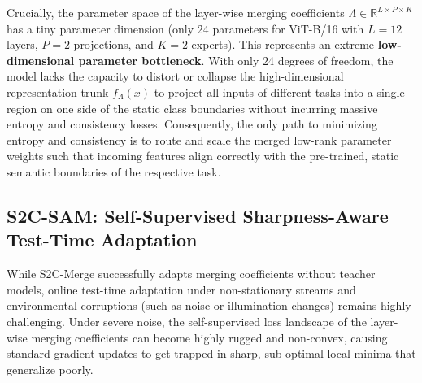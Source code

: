 \documentclass{article}
\theoremstyle{plain}
\theoremstyle{definition}
\theoremstyle{remark}
\begin{document}
Crucially, the parameter space of the layer-wise merging coefficients $\Lambda \in \mathbb{R}^{L \times P \times K}$ has a tiny parameter dimension (only 24 parameters for ViT-B/16 with $L=12$ layers, $P=2$ projections, and $K=2$ experts). This represents an extreme \textbf{low-dimensional parameter bottleneck}. With only 24 degrees of freedom, the model lacks the capacity to distort or collapse the high-dimensional representation trunk $f_{\Lambda}(x)$ to project all inputs of different tasks into a single region on one side of the static class boundaries without incurring massive entropy and consistency losses. Consequently, the only path to minimizing entropy and consistency is to route and scale the merged low-rank parameter weights such that incoming features align correctly with the pre-trained, static semantic boundaries of the respective task.

\subsection{S2C-SAM: Self-Supervised Sharpness-Aware Test-Time Adaptation}
While S2C-Merge successfully adapts merging coefficients without teacher models, online test-time adaptation under non-stationary streams and environmental corruptions (such as noise or illumination changes) remains highly challenging. Under severe noise, the self-supervised loss landscape of the layer-wise merging coefficients can become highly rugged and non-convex, causing standard gradient updates to get trapped in sharp, sub-optimal local minima that generalize poorly.
\end{document}
